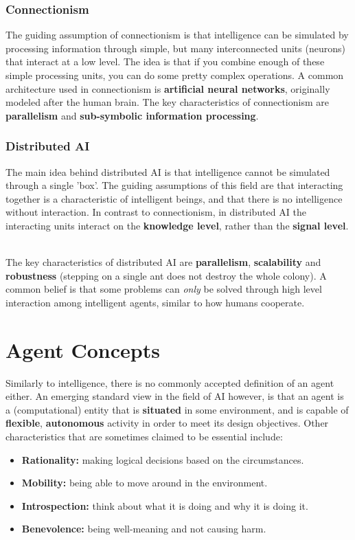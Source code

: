 \documentclass[12pt]{article}
\begin{document}
\subsubsection{Connectionism}
The guiding assumption of connectionism is that intelligence can be simulated by processing information through simple, but many interconnected units (neurons) that interact at a low level.
The idea is that if you combine enough of these simple processing units, you can do some pretty complex operations.
A common architecture used in connectionism is \textbf{artificial neural networks}, originally modeled after the human brain.
The key characteristics of connectionism are \textbf{parallelism} and \textbf{sub-symbolic information processing}.

\subsubsection{Distributed AI}
The main idea behind distributed AI is that intelligence cannot be simulated through a single 'box'.
The guiding assumptions of this field are that interacting together is a characteristic of intelligent beings, and that there is no intelligence without interaction.
In contrast to connectionism, in distributed AI the interacting units interact on the \textbf{knowledge level}, rather than the \textbf{signal level}.

\noindent
\\
The key characteristics of distributed AI are \textbf{parallelism}, \textbf{scalability} and \textbf{robustness} (stepping on a single ant does not destroy the whole colony).
A common belief is that some problems can \textit{only} be solved through high level interaction among intelligent agents, similar to how humans cooperate.

%
%
\newpage
\section{Agent Concepts}
Similarly to intelligence, there is no commonly accepted definition of an agent either.
An emerging standard view in the field of AI however, is that an agent is a (computational) entity that is \textbf{situated} in some environment, and is capable of \textbf{flexible}, \textbf{autonomous} activity in order to meet its design objectives.
Other characteristics that are sometimes claimed to be essential include:

\begin{itemize}
    \item \textbf{Rationality:} making logical decisions based on the circumstances.
    \item \textbf{Mobility:} being able to move around in the environment.
    \item \textbf{Introspection:} think about what it is doing and why it is doing it.
    \item \textbf{Benevolence:} being well-meaning and not causing harm.
\end{itemize}
\end{document}
